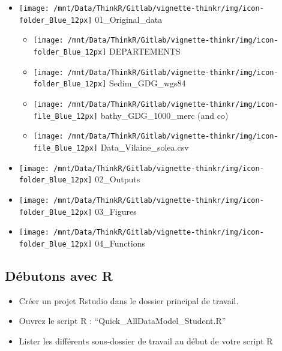 \documentclass[french,a4paper]{article}
\providecommand{\tightlist}{%
  \setlength{\itemsep}{0pt}\setlength{\parskip}{0pt}}
\begin{document}
\begin{itemize}
\tightlist
\item
  \texttt{[image: /mnt/Data/ThinkR/Gitlab/vignette-thinkr/img/icon-folder\_Blue\_12px]}
  01\_Original\_data

  \begin{itemize}
  \tightlist
  \item
    \texttt{[image: /mnt/Data/ThinkR/Gitlab/vignette-thinkr/img/icon-folder\_Blue\_12px]}
    DEPARTEMENTS
  \item
    \texttt{[image: /mnt/Data/ThinkR/Gitlab/vignette-thinkr/img/icon-folder\_Blue\_12px]}
    Sedim\_GDG\_wgs84
  \item
    \texttt{[image: /mnt/Data/ThinkR/Gitlab/vignette-thinkr/img/icon-file\_Blue\_12px]}
    bathy\_GDG\_1000\_merc (and co)
  \item
    \texttt{[image: /mnt/Data/ThinkR/Gitlab/vignette-thinkr/img/icon-file\_Blue\_12px]}
    Data\_Vilaine\_solea.csv
  \end{itemize}
\item
  \texttt{[image: /mnt/Data/ThinkR/Gitlab/vignette-thinkr/img/icon-folder\_Blue\_12px]}
  02\_Outputs
\item
  \texttt{[image: /mnt/Data/ThinkR/Gitlab/vignette-thinkr/img/icon-folder\_Blue\_12px]}
  03\_Figures
\item
  \texttt{[image: /mnt/Data/ThinkR/Gitlab/vignette-thinkr/img/icon-folder\_Blue\_12px]}
  04\_Functions
\end{itemize}

\subsection{Débutons avec R}\label{debutons-avec-r}

\begin{itemize}
\tightlist
\item
  Créer un projet Rstudio dans le dossier principal de travail.
\item
  Ouvrez le script R : ``Quick\_AllDataModel\_Student.R''
\item
  Lister les différents sous-dossier de travail au début de votre script
  R
\end{itemize}
\end{document}
